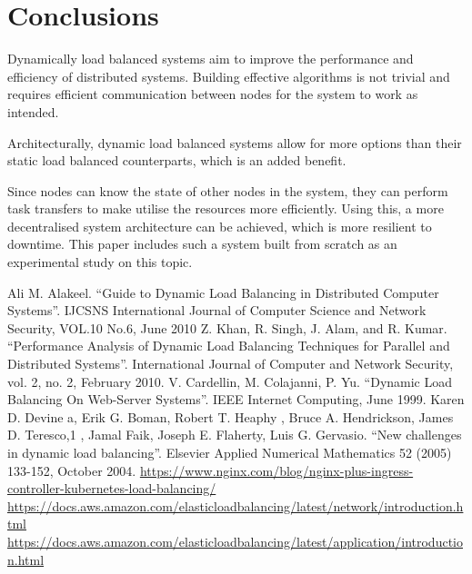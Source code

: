 \documentclass[conference]{IEEEtran}
\begin{document}
\section{Conclusions}
    Dynamically load balanced systems aim to improve the performance and efficiency of distributed systems. Building effective
algorithms is not trivial and requires efficient communication between nodes for the system to work as intended.

    Architecturally, dynamic load balanced systems allow for more options than their static load balanced counterparts, which
is an added benefit.

    Since nodes can know the state of other nodes in the system, they can perform task transfers to make utilise the resources
more efficiently. Using this, a more decentralised system architecture can be achieved, which is more resilient to downtime.
This paper includes such a system built from scratch as an experimental study on this topic.

\begin{thebibliography}{00}
     Ali M. Alakeel. ``Guide to Dynamic Load Balancing in Distributed Computer
    Systems''. IJCSNS International Journal of Computer Science and Network Security, VOL.10 No.6,
    June 2010
     Z. Khan, R. Singh, J. Alam, and R. Kumar. ``Performance Analysis
    of Dynamic Load Balancing Techniques for Parallel and Distributed
    Systems''. International Journal of Computer and Network Security,
    vol. 2, no. 2, February 2010.
     V. Cardellin, M. Colajanni, P. Yu. ``Dynamic Load Balancing On Web-Server Systems''. IEEE Internet Computing,
    June 1999.
     Karen D. Devine a, Erik G. Boman, Robert T. Heaphy , Bruce A. Hendrickson,
    James D. Teresco,1 , Jamal Faik, Joseph E. Flaherty, Luis G. Gervasio. ``New challenges in dynamic load balancing''.
    Elsevier Applied Numerical Mathematics 52 (2005) 133-152, October 2004.
     \url{https://www.nginx.com/blog/nginx-plus-ingress-controller-kubernetes-load-balancing/}
     \url{https://docs.aws.amazon.com/elasticloadbalancing/latest/network/introduction.html}
     \url{https://docs.aws.amazon.com/elasticloadbalancing/latest/application/introduction.html}
\end{thebibliography}
\end{document}
